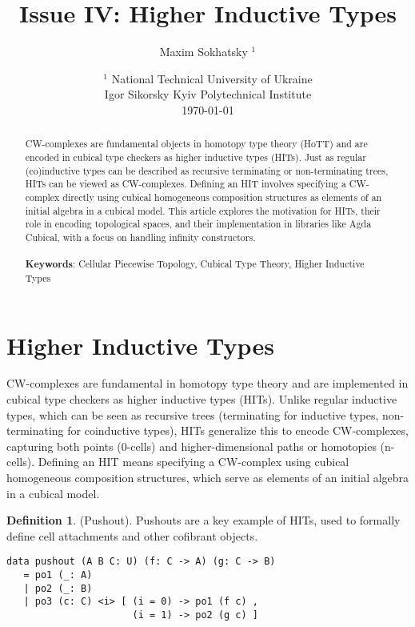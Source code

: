 \documentclass{article}
\theoremstyle{definition}
\newtheorem{definition}{Definition}
\begin{document}
\title{Issue IV: Higher Inductive Types}
\author{Maxim Sokhatsky $^1$}
\date{ $^1$ National Technical University of Ukraine \\
       \small Igor Sikorsky Kyiv Polytechnical Institute \\
       \today }

\maketitle

\begin{abstract}
CW-complexes are fundamental objects in homotopy type theory (HoTT) and are encoded in cubical type checkers as higher inductive types (HITs). Just as regular (co)inductive types can be described as recursive terminating or non-terminating trees, HITs can be viewed as CW-complexes. Defining an HIT involves specifying a CW-complex directly using cubical homogeneous composition structures as elements of an initial algebra in a cubical model. This article explores the motivation for HITs, their role in encoding topological spaces, and their implementation in libraries like Agda Cubical, with a focus on handling infinity constructors. \\
\\
{\bf Keywords}: Cellular Piecewise Topology, Cubical Type Theory, Higher Inductive Types
\end{abstract}
\tableofcontents

\newpage
\section{Higher Inductive Types}
CW-complexes are fundamental in homotopy type theory and are implemented in cubical type checkers as higher inductive types (HITs). Unlike regular inductive types, which can be seen as recursive trees (terminating for inductive types, non-terminating for coinductive types), HITs generalize this to encode CW-complexes, capturing both points (0-cells) and higher-dimensional paths or homotopies (n-cells). Defining an HIT means specifying a CW-complex using cubical homogeneous composition structures, which serve as elements of an initial algebra in a cubical model.

\begin{definition} (Pushout). Pushouts are a key example of HITs, used to formally define cell attachments and other cofibrant objects.
\begin{lstlisting}
data pushout (A B C: U) (f: C -> A) (g: C -> B)
   = po1 (_: A)
   | po2 (_: B)
   | po3 (c: C) <i> [ (i = 0) -> po1 (f c) ,
                      (i = 1) -> po2 (g c) ]
\end{lstlisting}
\end{definition}
\end{document}
